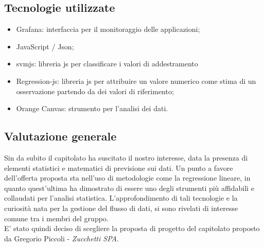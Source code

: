 \subsection{Tecnologie utilizzate}
\begin{itemize}
\item Grafana: interfaccia per il monitoraggio delle applicazioni;
\item JavaScript / Json;
\item svmjs: libreria js per classificare i valori di addestramento
\item Regression-js: libreria js per attribuire un valore numerico come stima di un osservazione partendo da dei valori di riferimento;
\item Orange Canvas: strumento per l’analisi dei dati.
\end{itemize}

\subsection{Valutazione generale}
Sin da subito il capitolato ha suscitato il nostro interesse, data la presenza di elementi statistici e matematici di previsione sui dati.
Un punto a favore dell’offerta proposta sta nell’uso di metodologie come la regressione lineare, in quanto quest’ultima ha dimostrato di essere uno degli strumenti più affidabili e collaudati per l’analisi statistica. 
L’approfondimento di tali tecnologie e la curiosità nata per la gestione del flusso di dati, si sono rivelati di interesse comune tra i membri del gruppo. \\
E’ stato quindi deciso di scegliere la proposta di progetto del capitolato proposto da Gregorio Piccoli - \textit{Zucchetti SPA}.




